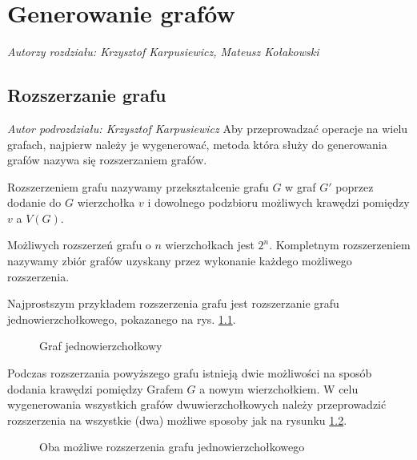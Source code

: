 \chapter{Generowanie grafów}
\textit{Autorzy rozdziału: Krzysztof Karpusiewicz, Mateusz Kołakowski}
\vspace{0.5cm}\newline
\section{Rozszerzanie grafu}
\textit{Autor podrozdziału: Krzysztof Karpusiewicz}
\vspace{0.5cm}\newline
Aby przeprowadzać operacje na wielu grafach, najpierw należy je wygenerować, metoda która służy do generowania grafów nazywa się rozszerzaniem grafów. 
\begin{definition} Rozszerzeniem grafu nazywamy przekształcenie grafu $G$ w graf $G'$ poprzez dodanie do $G$ wierzchołka $v$ i dowolnego podzbioru możliwych krawędzi pomiędzy $v$ a $V(G)$.
\end{definition}
Możliwych rozszerzeń grafu o $n$ wierzchołkach jest $2^n$. Kompletnym rozszerzeniem nazywamy zbiór grafów uzyskany przez wykonanie każdego możliwego rozszerzenia.

Najprostszym przykładem rozszerzenia grafu jest rozszerzanie grafu jednowierzchołkowego, pokazanego na rys. \ref{grafjednowierzcholkowy}.
\begin{figure}[H]
  \centering
   \caption{Graf jednowierzchołkowy}
   \label{grafjednowierzcholkowy}
\end{figure}


Podczas rozszerzania powyższego grafu istnieją dwie możliwości na sposób dodania krawędzi pomiędzy Grafem $G$ a nowym wierzchołkiem. W celu wygenerowania wszystkich grafów dwuwierzchołkowych należy przeprowadzić rozszerzenia na wszystkie (dwa) możliwe sposoby jak na rysunku \ref{rozszerzeniedwuwierzcholkowe}.
\begin{figure}[H]
  
  \centering
   \hspace{15mm}

   \caption{Oba możliwe rozszerzenia grafu jednowierzchołkowego}
   \label{rozszerzeniedwuwierzcholkowe}
\end{figure}

